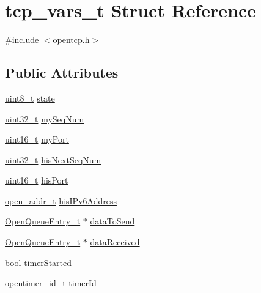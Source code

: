 \hypertarget{structtcp__vars__t}{}\section{tcp\+\_\+vars\+\_\+t Struct Reference}
\label{structtcp__vars__t}


{\ttfamily \#include $<$opentcp.\+h$>$}

\subsection*{Public Attributes}
\begin{DoxyCompactItemize}
\item 
\hyperlink{_p_e___types_8h_aba7bc1797add20fe3efdf37ced1182c5}{uint8\+\_\+t} \hyperlink{structtcp__vars__t_afd22d93533fe0d6c76a578697cc1dea3}{state}
\item 
\hyperlink{_p_e___types_8h_a33594304e786b158f3fb30289278f5af}{uint32\+\_\+t} \hyperlink{structtcp__vars__t_a7425973b98b5e3d201e0c527111722d6}{my\+Seq\+Num}
\item 
\hyperlink{_p_e___types_8h_a1f1825b69244eb3ad2c7165ddc99c956}{uint16\+\_\+t} \hyperlink{structtcp__vars__t_a27e7c0cfeeb60f0fbace53a0d1f84868}{my\+Port}
\item 
\hyperlink{_p_e___types_8h_a33594304e786b158f3fb30289278f5af}{uint32\+\_\+t} \hyperlink{structtcp__vars__t_aebf341acc3d7c2ab9f954437f4ea974e}{his\+Next\+Seq\+Num}
\item 
\hyperlink{_p_e___types_8h_a1f1825b69244eb3ad2c7165ddc99c956}{uint16\+\_\+t} \hyperlink{structtcp__vars__t_a6c0d1c9874d0f6dd01b6a90b094de8d6}{his\+Port}
\item 
\hyperlink{structopen__addr__t}{open\+\_\+addr\+\_\+t} \hyperlink{structtcp__vars__t_a844854565e6e9f990097576d4fb18cb0}{his\+I\+Pv6\+Address}
\item 
\hyperlink{struct_open_queue_entry__t}{Open\+Queue\+Entry\+\_\+t} $\ast$ \hyperlink{structtcp__vars__t_a5170824574c33f3c7ddcfb4417b5a8e8}{data\+To\+Send}
\item 
\hyperlink{struct_open_queue_entry__t}{Open\+Queue\+Entry\+\_\+t} $\ast$ \hyperlink{structtcp__vars__t_af774183effd1c202ca02a3bcb8ef9023}{data\+Received}
\item 
\hyperlink{_p_e___types_8h_a97a80ca1602ebf2303258971a2c938e2}{bool} \hyperlink{structtcp__vars__t_a375b45dfa99594ab77a4cef064cca624}{timer\+Started}
\item 
\hyperlink{group___open_timers_gae5ca9e65d270cdfa4bc74008d96d69ab}{opentimer\+\_\+id\+\_\+t} \hyperlink{structtcp__vars__t_a0902d2e84e93de3d1e81cd119feb6b8f}{timer\+Id}
\end{DoxyCompactItemize}


